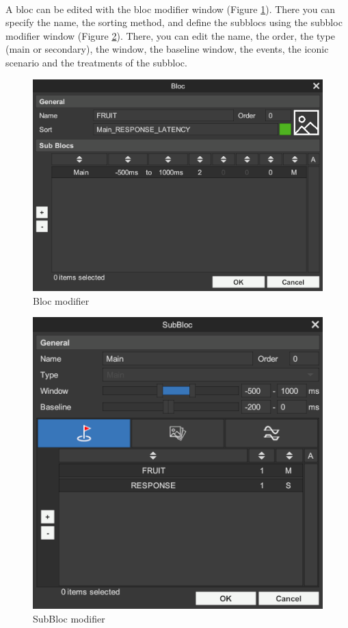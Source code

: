 \documentclass[a4paper]{article}
\begin{document}
\paragraph{} A bloc can be edited with the bloc modifier window (Figure \ref{blocModifierUI}). There you can specify the name, the sorting method, and define the subblocs using the subbloc modifier window (Figure \ref{subBlocModifierUI}). There, you can edit the name, the order, the type (main or secondary), the window, the baseline window, the events, the iconic scenario and the treatments of the subbloc.
\begin{figure}[H]
\begin{center}
\includegraphics[scale=0.5]{BlocModifier.png}
\end{center}
\caption{\label{blocModifierUI}Bloc modifier}
\end{figure}
\begin{figure}[H]
\begin{center}
\includegraphics[scale=0.5]{SubBlocModifier.png}
\end{center}
\caption{\label{subBlocModifierUI}SubBloc modifier}
\end{figure}
\end{document}
